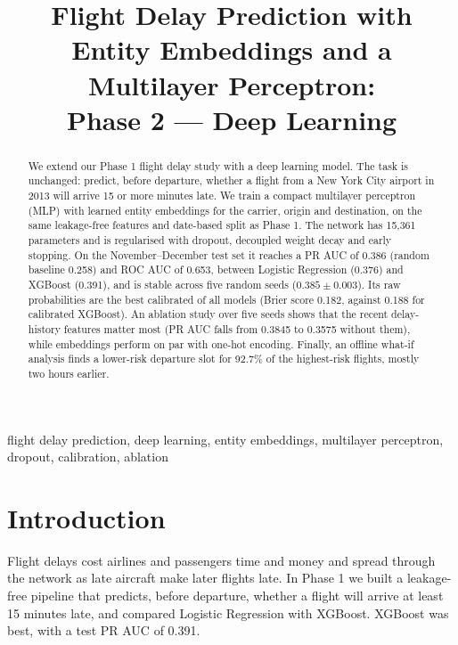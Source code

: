 \documentclass[conference]{IEEEtran}
\begin{document}
\title{Flight Delay Prediction with Entity Embeddings and a Multilayer Perceptron:\\Phase 2 --- Deep Learning}

\author{
}

\maketitle

\begin{abstract}
We extend our Phase 1 flight delay study with a deep learning model. The task is unchanged: predict, before
departure, whether a flight from a New York City airport in 2013 will arrive 15 or more minutes late. We train a
compact multilayer perceptron (MLP) with learned entity embeddings for the carrier, origin and destination, on the
same leakage-free features and date-based split as Phase 1. The network has 15{,}361 parameters and is
regularised with dropout, decoupled weight decay and early stopping. On the November--December test set it reaches
a PR AUC of 0.386 (random baseline 0.258) and ROC AUC of 0.653, between Logistic Regression (0.376) and XGBoost
(0.391), and is stable across five random seeds ($0.385 \pm 0.003$). Its raw probabilities are the best
calibrated of all models (Brier score 0.182, against 0.188 for calibrated XGBoost). An ablation study over five
seeds shows that the recent delay-history features matter most (PR AUC falls from 0.3845 to 0.3575 without them), while
embeddings perform on par with one-hot encoding. Finally, an offline what-if analysis finds a lower-risk departure
slot for 92.7\% of the highest-risk flights, mostly two hours earlier.
\end{abstract}

\begin{IEEEkeywords}
flight delay prediction, deep learning, entity embeddings, multilayer perceptron, dropout, calibration, ablation
\end{IEEEkeywords}

\section{Introduction}
Flight delays cost airlines and passengers time and money and spread through the network as late aircraft make
later flights late. In Phase 1 we built a leakage-free pipeline that predicts, before departure, whether a flight
will arrive at least 15 minutes late, and compared Logistic Regression with XGBoost. XGBoost was best, with a test
PR AUC of 0.391.
\end{document}
